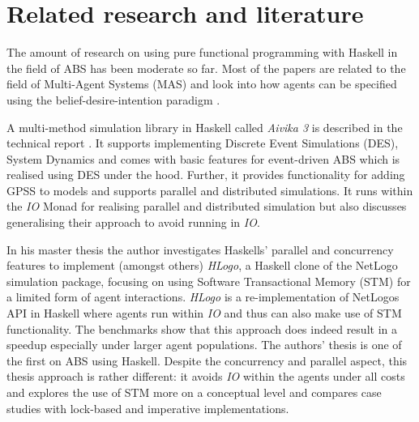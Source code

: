 \section{Related research and literature}
\label{sec:literature}

The amount of research on using pure functional programming with Haskell in the field of ABS has been moderate so far. Most of the papers are related to the field of Multi-Agent Systems (MAS) and look into how agents can be specified using the belief-desire-intention paradigm \cite{de_jong_suitability_2014,jankovic_functional_2007,sulzmann_specifying_2007}.

A multi-method simulation library in Haskell called \textit{Aivika 3} is described in the technical report \cite{sorokin_aivika_2015}. It supports implementing Discrete Event Simulations (DES), System Dynamics and comes with basic features for event-driven ABS which is realised using DES under the hood. Further, it provides functionality for adding GPSS to models and supports parallel and distributed simulations. It runs within the \textit{IO} Monad for realising parallel and distributed simulation but also discusses generalising their approach to avoid running in \textit{IO}.

In his master thesis \cite{bezirgiannis_improving_2013} the author investigates Haskells' parallel and concurrency features to implement (amongst others) \textit{HLogo}, a Haskell clone of the NetLogo \cite{wilensky_introduction_2015} simulation package, focusing on using Software Transactional Memory (STM) for a limited form of agent interactions. \textit{HLogo} is a re-implementation of NetLogos API in Haskell where agents run within \textit{IO} and thus can also make use of STM functionality. The benchmarks show that this approach does indeed result in a speedup especially under larger agent populations. The authors' thesis is one of the first on ABS using Haskell. Despite the concurrency and parallel aspect, this thesis approach is rather different: it avoids \textit{IO} within the agents under all costs and explores the use of STM more on a conceptual level and compares case studies with lock-based and imperative implementations.

